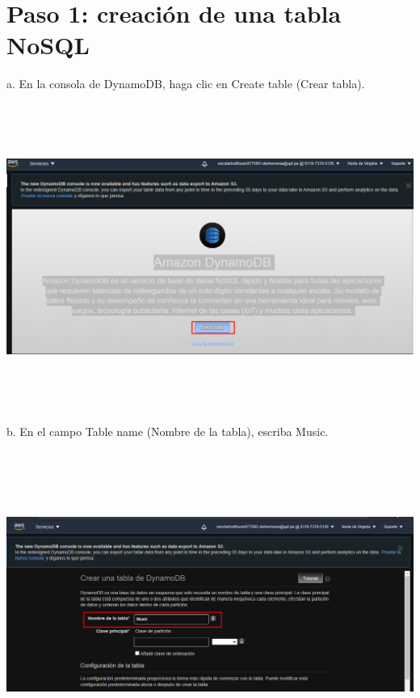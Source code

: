 \documentclass[12pt,letterpaper]{article}
\begin{document}
\section{Paso 1: creación de una tabla NoSQL
} 

a. En la consola de DynamoDB, haga clic en Create table (Crear tabla).
\begin{center}
    \includegraphics[width=18cm, height=10cm]{img/2.png}  
\end{center}

b. En el campo Table name (Nombre de la tabla), escriba Music.

\begin{center}
    \includegraphics[width=18cm, height=10cm]{img/3.png}  
\end{center}
\end{document}
